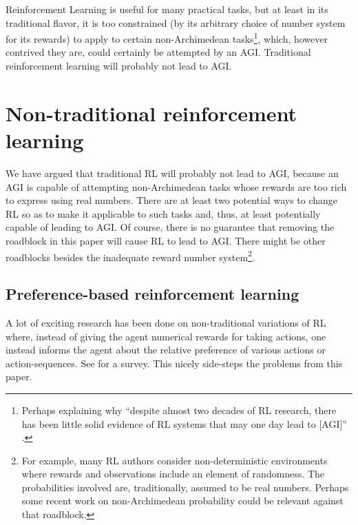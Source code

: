 \documentclass[twoside,11pt]{article}
\begin{document}
Reinforcement Learning is useful for many practical tasks, but at least in
its traditional flavor, it is too constrained (by its arbitrary choice of number
system for its rewards) to apply to certain
non-Archimedean tasks\footnote{Perhaps explaining why
``despite almost two decades of RL research, there has been little solid
evidence of RL systems that may one day lead to [AGI]''
\citep{livingston}.}, which, however contrived they are, could certainly be
attempted by an AGI. Traditional reinforcement learning will probably
not lead to AGI.


\section{Non-traditional reinforcement learning}
\label{nontraditionalsection}

We have argued that traditional RL will probably not lead to AGI, because
an AGI is capable of attempting non-Archimedean tasks whose rewards are
too rich to express using real numbers. There are at least two
potential ways to change RL so as to make it applicable to such tasks and,
thus, at least potentially capable of leading to AGI. Of course, there is
no guarantee that removing the roadblock in this paper will cause RL to
lead to AGI. There might be other roadblocks besides the inadequate reward
number system\footnote{For example, many RL authors consider non-deterministic
environments where rewards and observations include an element of
randomness. The probabilities involved are, traditionally, assumed to be
real numbers. Perhaps some recent work \citep{benci2013non} on non-Archimedean
probability could be relevant against that roadblock.}.

\subsection{Preference-based reinforcement learning}

A lot of exciting research has been done on non-traditional variations
of RL where, instead of giving the agent numerical rewards for taking actions,
one instead informs the agent about the relative preference of various
actions or action-sequences. See \citep{wirth2017survey} for a survey.
This nicely side-steps the problems from this paper.
\end{document}
